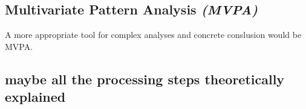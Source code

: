 \subsection{Multivariate Pattern Analysis \textit{(MVPA)}}

A more appropriate tool for complex analyses and concrete conslusion would be \gls{MVPA}.






\subsection{maybe all the processing steps theoretically explained}
















